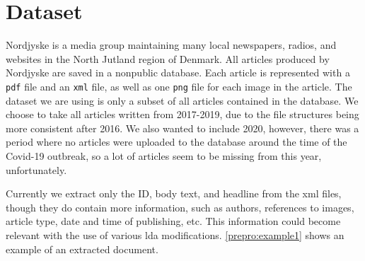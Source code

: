 \section{Dataset}\label{sec:dataset}
Nordjyske is a media group maintaining many local newspapers, radios, and websites in the North Jutland region of Denmark.
All articles produced by Nordjyske are saved in a nonpublic database.
Each article is represented with a \texttt{pdf} file and an \texttt{xml} file, as well as one \texttt{png} file for each image in the article.
The dataset we are using is only a subset of all articles contained in the database.
We choose to take all articles written from 2017-2019, due to the file structures being more consistent after 2016.
We also wanted to include 2020, however, there was a period where no articles were uploaded to the database around the time of the Covid-19 outbreak, so a lot of articles seem to be missing from this year, unfortunately.

Currently we extract only the ID, body text, and headline from the xml files, though they do contain more information, such as authors, references to images, article type, date and time of publishing, etc.
This information could become relevant with the use of various \gls{lda} modifications.
\autoref{prepro:example1} shows an example of an extracted document.
